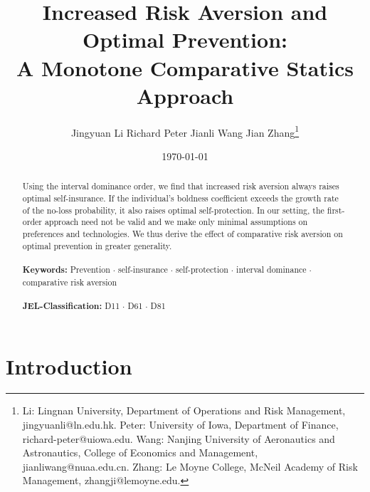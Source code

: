 \documentclass[11pt]{article}
\begin{document}
\title{Increased Risk Aversion and Optimal Prevention:\\A Monotone Comparative Statics Approach}
\author{Jingyuan Li \qquad Richard Peter \qquad Jianli Wang \qquad Jian Zhang\footnote{Li: Lingnan University, Department of Operations and Risk Management, jingyuanli@ln.edu.hk. Peter: University of Iowa, Department of Finance, richard-peter@uiowa.edu. Wang: Nanjing University of Aeronautics and Astronautics, College of Economics and Management, jianliwang@nuaa.edu.cn. Zhang: Le Moyne College, McNeil Academy of Risk Management, zhangji@lemoyne.edu.}}

\date{\today}
\maketitle

\begin{abstract}
	Using the interval dominance order, we find that increased risk aversion always raises optimal self-insurance. If the individual's boldness coefficient exceeds the growth rate of the no-loss probability, it also raises optimal self-protection. In our setting, the first-order approach need not be valid and we make only minimal assumptions on preferences and technologies. We thus derive the effect of comparative risk aversion on optimal prevention in greater generality.\\
	\\
	\noindent
	\textbf{Keywords:} Prevention $\cdot$ self-insurance $\cdot$ self-protection $\cdot$ interval dominance $\cdot$ comparative risk aversion \\
	\\
	\textbf{JEL-Classification:} D11 $\cdot$ D61 $\cdot$ D81
\end{abstract}

\begin{flushleft}
\end{flushleft}

\vspace*{\fill}
\thispagestyle{empty} \setcounter{page}{0}
\newpage

\section{Introduction}
\end{document}
